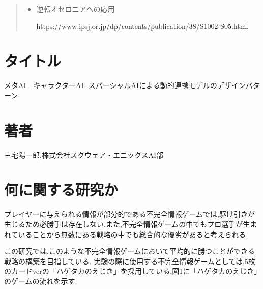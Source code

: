 \documentclass{jarticle}     %
\begin{document}
\begin{quote}
  \begin{itemize}
   \item 逆転オセロニアへの応用\par
   \url{https://www.ipsj.or.jp/dp/contents/publication/38/S1002-S05.html}
  \end{itemize}
 \end{quote}


 \section*{タイトル}
 メタAI - キャラクターAI -スパーシャルAIによる動的連携モデルのデザインパターン\cite{1}

\section*{著者}
三宅陽一郎,株式会社スクウェア・エニックスAI部

\section*{何に関する研究か}
プレイヤーに与えられる情報が部分的である不完全情報ゲームでは,駆け引きが生じるため必勝手は存在しない.また,不完全情報ゲームの中でもプロ選手が生まれていることから無数にある戦略の中でも総合的な優劣があると考えられる.\par
この研究では,このような不完全情報ゲームにおいて平均的に勝つことができる戦略の構築を目指している.
実験の際に使用する不完全情報ゲームとしては,5枚のカードverの「ハゲタカのえじき」を採用している.図1に「ハゲタカのえじき」のゲームの流れを示す.\par







\end{document}
